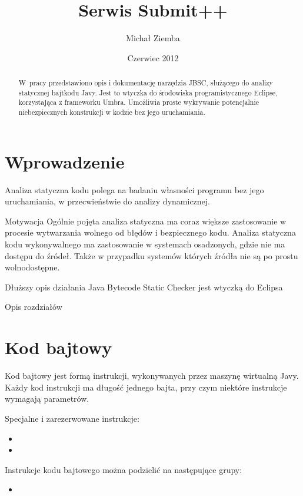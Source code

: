 \documentclass{pracamgr}
\author{Michał Ziemba}
\title{Serwis Submit++}
\date{Czerwiec 2012}
\begin{document}
\maketitle

\begin{abstract}
  W~pracy przedstawiono opis i dokumentację narzędzia JBSC, służącego do
  analizy statycznej bajtkodu Javy. Jest to wtyczka do środowiska programistycznego
  Eclipse, korzystająca z frameworku Umbra. Umożliwia proste wykrywanie potencjalnie
  niebezpiecznych konstrukcji w kodzie bez jego uruchamiania.
\end{abstract}

\tableofcontents

\chapter*{Wprowadzenie}

    Analiza statyczna kodu polega na badaniu własności programu bez jego uruchamiania,
    w przecwieństwie do analizy dynamicznej. 

    Motywacja
    Ogólnie pojęta analiza statyczna ma coraz większe zastosowanie w procesie wytwarzania wolnego od błędów
    i bezpiecznego kodu. Analiza statyczna kodu wykonywalnego ma zastosowanie w systemach osadzonych, gdzie
    nie ma dostępu do źródeł. Także w przypadku systemów których źródła nie są po prostu wolnodostępne.

Dłuższy opis działania
Java Bytecode Static Checker jest wtyczką do Eclipsa 

Opis rozdziałów

\chapter{Kod bajtowy}\label{r:bytecode}

    Kod bajtowy jest formą instrukcji, wykonywanych przez maszynę wirtualną Javy. Każdy kod instrukcji
    ma długość jednego bajta, przy czym niektóre instrukcje wymagają parametrów.

    Specjalne i zarezerwowane instrukcje:
    \begin{itemize}
        \item 
        \item
    \end{itemize}
    
    Instrukcje kodu bajtowego można podzielić na następujące grupy:
    \begin{itemize}
        \item
    \end{itemize}
    
\end{document}
